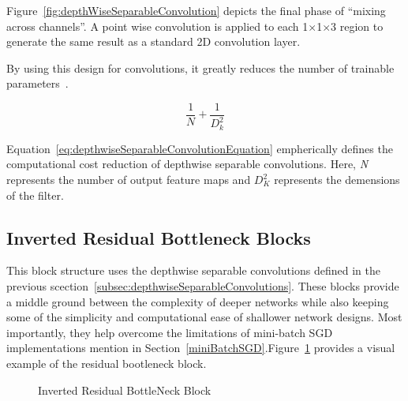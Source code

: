 \documentclass[conference]{IEEEtran}
\begin{document}
Figure~\ref{fig:depthWiseSeparableConvolution} depicts the final phase of ``mixing
across channels''. A point wise convolution is applied to each
1$\times$1$\times$3 region to generate the same result as a standard 2D
convolution layer.

By using this design for convolutions, it greatly reduces the number of
trainable parameters~\cite{mobile_net_paper}.

\begin{equation}
    \frac{1}{N} + \frac{1}{D_k^2}
    \label{eq:depthwiseSeparableConvolutionEquation}
\end{equation}

Equation~\ref{eq:depthwiseSeparableConvolutionEquation} empherically defines the
computational cost reduction of depthwise separable convolutions. Here,
\textit{N} represents the number of output feature maps and $D_K^2$ represents
the demensions of the filter.



\subsection{Inverted Residual Bottleneck Blocks} %

This block structure uses the depthwise separable convolutions defined in the
previous scection~\ref{subsec:depthwiseSeparableConvolutions}. These blocks
provide a middle ground between the complexity of deeper networks while also
keeping some of the simplicity and computational ease of shallower network
designs. Most importantly, they help overcome the limitations of mini-batch SGD
implementations mention in
Section~\ref{miniBatchSGD}.Figure~\ref{fig:invertedResidualBottleneckBlock}
provides a visual example of the residual bootleneck block.


\begin{figure}[H]
    \centering
    \caption{Inverted Residual BottleNeck
    Block~\cite[p. 3]{mobile_net_v2_paper}}\label{fig:invertedResidualBottleneckBlock}
\end{figure}
\end{document}
